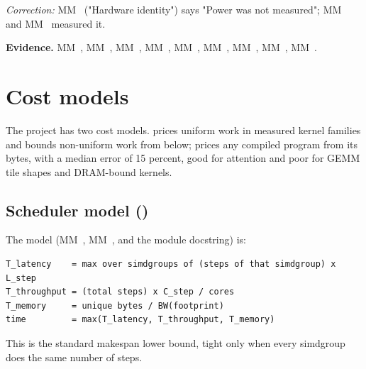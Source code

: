 \emph{Correction:} MM~ ("Hardware identity") says "Power was not measured"; MM~ and MM~ measured it.

\textbf{Evidence.} MM~, MM~, MM~, MM~, MM~, MM~, MM~, MM~, MM~.

\section{Cost models}\label{sec:cost-models-their}

The project has two cost models.  prices uniform work in measured kernel families and bounds
non-uniform work from below;  prices any compiled program from its bytes, with a median error of
15 percent, good for attention and poor for GEMM tile shapes and DRAM-bound kernels.

\subsection*{Scheduler model ()}

The model (MM~, MM~, and the module docstring) is:

\begin{lstlisting}
T_latency    = max over simdgroups of (steps of that simdgroup) x L_step
T_throughput = (total steps) x C_step / cores
T_memory     = unique bytes / BW(footprint)
time         = max(T_latency, T_throughput, T_memory)
\end{lstlisting}

This is the standard makespan lower bound, tight only when every simdgroup does the same number of steps.

